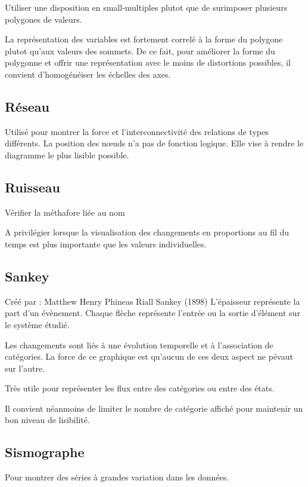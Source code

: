 \documentclass[a4paper,12pt]{article}
\begin{document}
\begin{multicols}{2}
Utiliser une disposition en small-multiples plutot que de surimposer plusieurs polygones de valeurs. \autocite{jonathanschwabishRelationship2021}

La représentation des variables est fortement correlé à la forme du polygone plutot qu'aux valeurs des sommets. \autocite{sosulskiGraphics2019} De ce fait, pour améliorer la forme du polygonne et offrir une représentation avec le moins de distortions possibles, il convient d'homogénéiser les échelles des axes.
\subsection*{Réseau}
\label{sec:org963467c}
Utilisé pour montrer la force et l'interconnectivité des relations de types différents. \autocite{alansmithLexiqueVisuel} La position des nœuds n’a pas de fonction logique. Elle vise à rendre le diagramme le plus lisible possible. \autocite{mikeyiHowChooseRight2020}
\subsection*{Ruisseau}
\label{sec:orgebd8969}
Vérifier la méthafore liée au nom

A privilégier lorsque la visualisation des changements en proportions au fil du temps est plus importante que les valeurs individuelles. \autocite{alansmithLexiqueVisuel}
\subsection*{Sankey}
\label{sec:org7d411f8}
Créé par : Matthew Henry Phineas Riall Sankey (1898)
L'épaisseur représente la part d'un évènement. Chaque flèche représente l'entrée ou la sortie d'élément sur le système étudié. \autocite{mikeyiHowChooseRight2020}

Les changements sont liés à une évolution temporelle et à l'association de catégories. La force de ce graphique est qu'aucun de ces deux aspect ne pévaut sur l'autre. \autocite{jonathanschwabishComparingCategories2021}

Très utile pour représenter les flux entre des catégories ou entre des états. \autocite{jonathanschwabishComparingCategories2021}

Il convient néanmoins de limiter le nombre de catégorie  affiché pour maintenir un bon niveau de lisibilité. \autocite{jonathanschwabishComparingCategories2021}
\subsection*{Sismographe}
\label{sec:org88c79a2}
Pour montrer des séries à grandes variation dans les données. \autocite{alansmithLexiqueVisuel}

\end{multicols}
\end{document}
